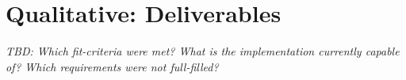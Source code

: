 
\section{Qualitative: Deliverables}
\label{sec:pm-deliverables}
\emph{TBD: Which fit-criteria were met? What is the implementation currently capable of? Which requirements were not full-filled?}